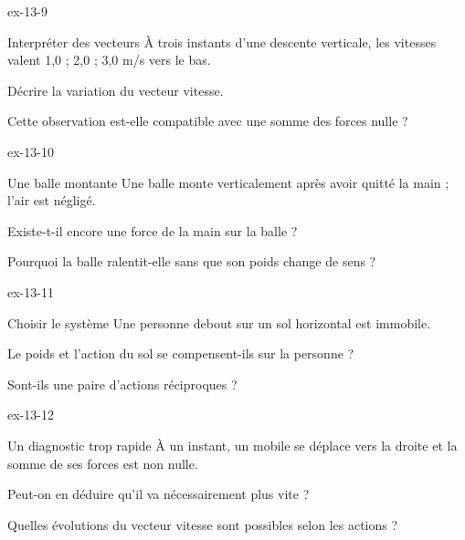 \begin{blocLivre}{ex-13-9}\begin{exercice}[3]{Interpréter des vecteurs}
À trois instants d’une descente verticale, les vitesses valent 1,0 ; 2,0 ; 3,0 m/s vers le bas.
\begin{questions}
\item Décrire la variation du vecteur vitesse.
\item Cette observation est-elle compatible avec une somme des forces nulle ?
\end{questions}
\end{exercice}\end{blocLivre}
\begin{blocLivre}{ex-13-10}\begin{exercice}[3]{Une balle montante}
Une balle monte verticalement après avoir quitté la main ; l’air est négligé.
\begin{questions}
\item Existe-t-il encore une force de la main sur la balle ?
\item Pourquoi la balle ralentit-elle sans que son poids change de sens ?
\end{questions}
\end{exercice}\end{blocLivre}
\begin{blocLivre}{ex-13-11}\begin{exercice}[3]{Choisir le système}
Une personne debout sur un sol horizontal est immobile.
\begin{questions}
\item Le poids et l’action du sol se compensent-ils sur la personne ?
\item Sont-ils une paire d’actions réciproques ?
\end{questions}
\end{exercice}\end{blocLivre}
\begin{blocLivre}{ex-13-12}\begin{exercice}[3]{Un diagnostic trop rapide}
À un instant, un mobile se déplace vers la droite et la somme de ses forces est non nulle.
\begin{questions}
\item Peut-on en déduire qu’il va nécessairement plus vite ?
\item Quelles évolutions du vecteur vitesse sont possibles selon les actions ?
\end{questions}
\end{exercice}\end{blocLivre}

